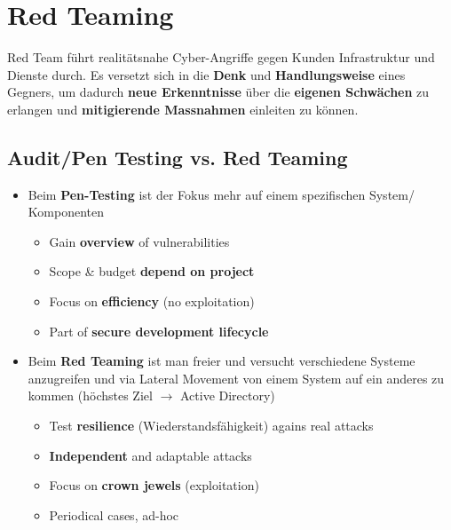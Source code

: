 

\section{Red Teaming}
Red Team führt realitätsnahe Cyber-Angriffe gegen Kunden Infrastruktur und Dienste durch. Es versetzt sich in die \textbf{Denk} und \textbf{Handlungsweise} eines Gegners, um dadurch \textbf{neue Erkenntnisse} über die \textbf{eigenen Schwächen} zu erlangen und \textbf{mitigierende Massnahmen} einleiten zu können.

\subsection{Audit/Pen Testing vs. Red Teaming}
\begin{itemize}
    \item Beim \textbf{Pen-Testing} ist der Fokus mehr auf einem spezifischen System/ Komponenten
    \begin{itemize}
        \item Gain \textbf{overview} of vulnerabilities
        \item Scope \& budget \textbf{depend on project}
        \item Focus on \textbf{efficiency} (no exploitation)
        \item Part of \textbf{secure development lifecycle}\\
    \end{itemize}
    \item Beim \textbf{Red Teaming} ist man freier und versucht verschiedene Systeme anzugreifen und via Lateral Movement von einem System auf ein anderes zu kommen (höchstes Ziel $\rightarrow$ Active Directory)
    \begin{itemize}
        \item Test \textbf{resilience} (Wiederstandsfähigkeit) agains real attacks
        \item \textbf{Independent} and adaptable attacks
        \item Focus on \textbf{crown jewels} (exploitation)
        \item Periodical cases, ad-hoc
    \end{itemize}
\end{itemize}

